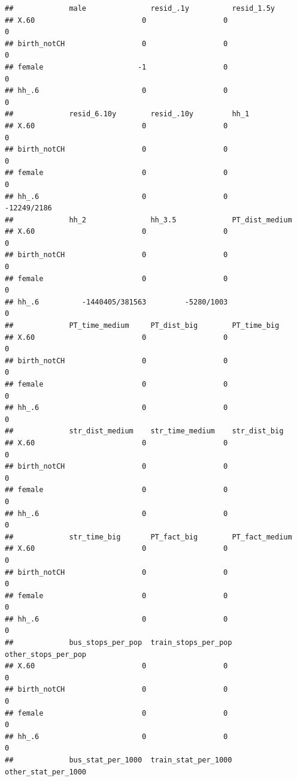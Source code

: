 \documentclass[
]{article}
\begin{document}
\begin{verbatim}
##             male               resid_.1y          resid_1.5y        
## X.60                         0                  0                  0
## birth_notCH                  0                  0                  0
## female                      -1                  0                  0
## hh_.6                        0                  0                  0
##             resid_6.10y        resid_.10y         hh_1              
## X.60                         0                  0                  0
## birth_notCH                  0                  0                  0
## female                       0                  0                  0
## hh_.6                        0                  0        -12249/2186
##             hh_2               hh_3.5             PT_dist_medium    
## X.60                         0                  0                  0
## birth_notCH                  0                  0                  0
## female                       0                  0                  0
## hh_.6          -1440405/381563         -5280/1003                  0
##             PT_time_medium     PT_dist_big        PT_time_big       
## X.60                         0                  0                  0
## birth_notCH                  0                  0                  0
## female                       0                  0                  0
## hh_.6                        0                  0                  0
##             str_dist_medium    str_time_medium    str_dist_big      
## X.60                         0                  0                  0
## birth_notCH                  0                  0                  0
## female                       0                  0                  0
## hh_.6                        0                  0                  0
##             str_time_big       PT_fact_big        PT_fact_medium    
## X.60                         0                  0                  0
## birth_notCH                  0                  0                  0
## female                       0                  0                  0
## hh_.6                        0                  0                  0
##             bus_stops_per_pop  train_stops_per_pop other_stops_per_pop
## X.60                         0                  0                   0 
## birth_notCH                  0                  0                   0 
## female                       0                  0                   0 
## hh_.6                        0                  0                   0 
##             bus_stat_per_1000  train_stat_per_1000 other_stat_per_1000

\end{verbatim}
\end{document}
